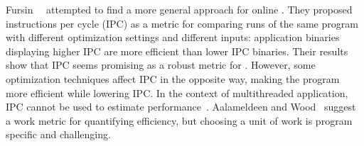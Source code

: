 Fursin~\etal~\cite{fursin07} attempted to find a more general approach for online \itercomp. They proposed instructions per cycle (IPC) as
a metric for comparing runs of the same program with different optimization settings and different inputs: application binaries displaying
higher IPC are more efficient than lower IPC binaries. Their results show that IPC seems promising as a robust metric for {\itercomp}.
However, some optimization techniques affect IPC in the opposite way, making the program more efficient while lowering IPC. In the context
of multithreaded application, IPC cannot be used to estimate performance~\cite{alameldeen06,eyerman08}. Aalameldeen and
Wood~\cite{alameldeen06} suggest a work metric for quantifying efficiency, but choosing a unit of work is program specific and challenging.





